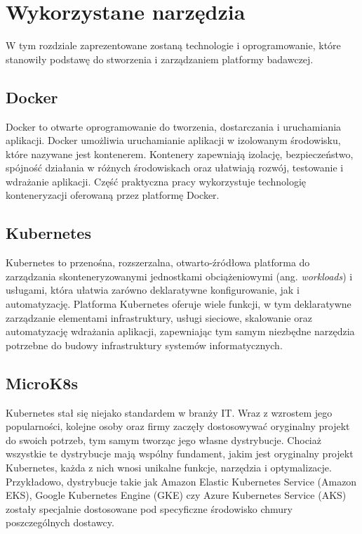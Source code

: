 \newpage

\section{Wykorzystane narzędzia}\label{sec:wykorzystane-narzedzia}

W tym rozdziale zaprezentowane zostaną technologie i oprogramowanie, które stanowiły podstawę do stworzenia i zarządzaniem platformy badawczej.

\subsection{Docker}\label{subsec:docker}

Docker to otwarte oprogramowanie do tworzenia, dostarczania i uruchamiania aplikacji\cite{docker-overview}.
Docker umożliwia uruchamianie aplikacji w izolowanym środowisku, które nazywane jest kontenerem.
Kontenery zapewniają izolację, bezpieczeństwo, spójność działania w różnych środowiskach oraz ułatwiają rozwój, testowanie i wdrażanie aplikacji.
Część praktyczna pracy wykorzystuje technologię konteneryzacji oferowaną przez platformę Docker.

\subsection{Kubernetes}\label{subsec:kubernetes}

Kubernetes to przenośna, rozszerzalna, otwarto-źródłowa platforma do zarządzania skonteneryzowanymi jednostkami obciążeniowymi (ang. \emph{workloads}) i usługami, która ułatwia zarówno deklaratywne konfigurowanie, jak i automatyzację\cite{kubernetes-overview}.
Platforma Kubernetes oferuje wiele funkcji, w tym deklaratywne zarządzanie elementami infrastruktury, usługi sieciowe, skalowanie oraz automatyzację wdrażania aplikacji, zapewniając tym samym niezbędne narzędzia potrzebne do budowy infrastruktury systemów informatycznych.

\subsection{MicroK8s}\label{subsec:microk8s}

Kubernetes stał się niejako standardem w branży IT\@.
Wraz z wzrostem jego popularności, kolejne osoby oraz firmy zaczęły dostosowywać oryginalny projekt do swoich potrzeb, tym samym tworząc jego własne dystrybucje.
Chociaż wszystkie te dystrybucje mają wspólny fundament, jakim jest oryginalny projekt Kubernetes, każda z nich wnosi unikalne funkcje, narzędzia i optymalizacje.
Przykładowo, dystrybucje takie jak Amazon Elastic Kubernetes Service (Amazon EKS), Google Kubernetes Engine (GKE) czy Azure Kubernetes Service (AKS) zostały specjalnie dostosowane pod specyficzne środowisko chmury poszczególnych dostawcy.


